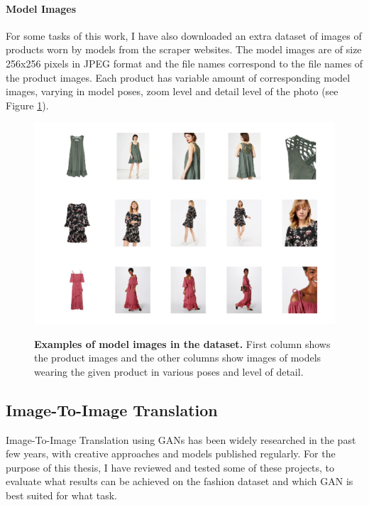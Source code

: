 \documentclass{article}
\begin{document}
\pagebreak
\paragraph{Model Images}
For some tasks of this work, I have also downloaded an extra dataset of images of products worn by models from the scraper websites. The model images are of size 256x256 pixels in JPEG format and the file names correspond to the file names of the product images. Each product has variable amount of corresponding model images, varying in model poses, zoom level and detail level of the photo (see Figure \ref{fig:models}).

\begin{figure}[t]
\centering
{\includegraphics[width=\linewidth]{dataset_examples/model_images}}
\caption{\label{fig:models} \textbf{Examples of model images in the dataset.} First column shows the product images and the other columns show images of models wearing the given product in various poses and level of detail.}
\end{figure}

\pagebreak
\subsection{Image-To-Image Translation}
Image-To-Image Translation using GANs has been widely researched in the past few years, with creative approaches and models published regularly. For the purpose of this thesis, I have reviewed and tested some of these projects, to evaluate what results can be achieved on the fashion dataset and which GAN is best suited for what task.
\end{document}
